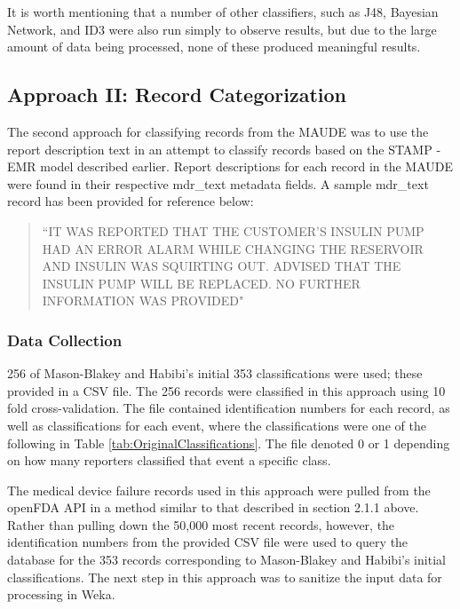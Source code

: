 \documentclass[11pt, notitlepage,abstracton,oneside]{article}   	%
\begin{document}
It is worth mentioning that a number of other classifiers, such as J48, Bayesian Network, and ID3 were also run simply to observe results, but due to the large amount of data being processed, none of these produced meaningful results. 

\subsection{Approach II: Record Categorization}
The second approach for classifying records from the MAUDE was to use the report description text in an attempt to classify records based on the STAMP - EMR model described earlier. Report descriptions for each record in the MAUDE were found in their respective mdr\_text metadata fields. A sample mdr\_text record has been provided for reference below:

\begin{quote}
``IT WAS REPORTED THAT THE CUSTOMER'S INSULIN PUMP HAD AN ERROR ALARM WHILE CHANGING THE RESERVOIR AND INSULIN WAS SQUIRTING OUT. ADVISED THAT THE INSULIN PUMP WILL BE REPLACED. NO FURTHER INFORMATION WAS PROVIDED"
\end{quote} 

\subsubsection{Data Collection}
256 of Mason-Blakey and Habibi's initial 353 classifications were used; these provided in a CSV file. The 256 records were classified in this approach using 10 fold cross-validation. The file contained identification numbers for each record, as well as classifications for each event, where the classifications were one of the following in Table \ref{tab:OriginalClassifications}. The file denoted 0 or 1 depending on how many reporters classified that event a specific class.

The medical device failure records used in this approach were pulled from the openFDA API in a method similar to that described in section 2.1.1 above. Rather than pulling down the 50,000 most recent records, however, the identification numbers from the provided CSV file were used to query the database for the 353 records corresponding to Mason-Blakey and Habibi's initial classifications. The next step in this approach was to sanitize the input data for processing in Weka.
\end{document}

